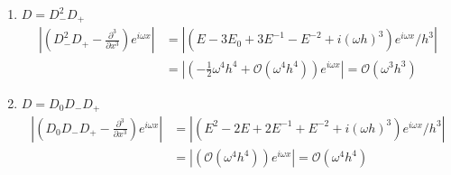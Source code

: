 \begin{solution}
\begin{enumerate}
        \item $D = D_-^2 D_+$ 
        \begin{align*}
            \left| \left(D_-^2 D_+ - \frac{\partial^3}{\partial x^3}\right)
            e^{i\omega x}  \right| &= 
            \left| \left( E - 3E_0 + 3E^{-1} - E^{-2} + i (\omega h)^3 \right)
            e^{i\omega x} / h^3  \right| \\
            &=\left| (-\frac{1}{2} \omega^4 h^4 +
             \mathcal{O} (\omega^4 h^4) )  e^{i\omega x} \right|
             =  \mathcal{O} (\omega^3 h^3)
        \end{align*}

        \item $D = D_0 D_- D_+$ 
        \begin{align*}
            \left| \left(D_0 D_- D_+ - \frac{\partial^3}{\partial x^3}\right)
            e^{i\omega x}  \right| &= 
            \left| \left( E^2 - 2E + 2E^{-1} + E^{-2} + i (\omega h)^3 \right)
            e^{i\omega x} / h^3  \right| \\
            &=\left| (
            \mathcal{O} (\omega^4 h^4) )  e^{i\omega x} \right|
            =  \mathcal{O} (\omega^4 h^4)
        \end{align*}
\end{enumerate}

 \end{solution}